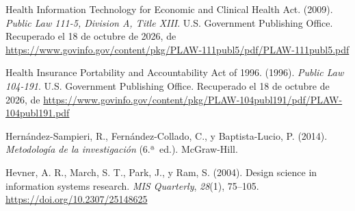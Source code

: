 \documentclass[12pt, a4paper]{article}
\begin{document}
\begin{list}{}{\setlength{\leftmargin}{1.27cm}\setlength{\itemindent}{-1.27cm}%
  \setlength{\labelwidth}{0pt}\setlength{\labelsep}{0pt}\setlength{\itemsep}{6pt}}
\item Health Information Technology for Economic and Clinical
  Health Act. (2009). \textit{Public Law 111-5, Division A,
  Title XIII}. U.S. Government Publishing Office.
  Recuperado el 18 de octubre de 2026, de \url{https://www.govinfo.gov/content/pkg/PLAW-111publ5/pdf/PLAW-111publ5.pdf}


\item Health Insurance Portability and Accountability Act of
  1996. (1996). \textit{Public Law 104-191}. U.S. Government
  Publishing Office.
  Recuperado el 18 de octubre de 2026, de \url{https://www.govinfo.gov/content/pkg/PLAW-104publ191/pdf/PLAW-104publ191.pdf}


\item Hernández-Sampieri, R., Fernández-Collado, C., y
  Baptista-Lucio, P. (2014). \textit{Metodología de la
   investigación} (6.ª~ed.). McGraw-Hill.
 


\item Hevner, A. R., March, S. T., Park, J., y Ram, S. (2004).
  Design science in information systems research.
  \textit{MIS Quarterly}, \textit{28}(1), 75--105.
  \url{https://doi.org/10.2307/25148625}




\end{list}
\end{document}
